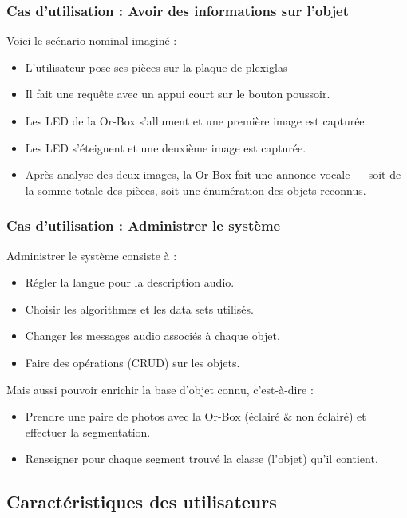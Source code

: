     \subsubsection{Cas d'utilisation : Avoir des informations sur l'objet}
        
Voici le scénario nominal imaginé :
\begin{itemize}
    \item L'utilisateur pose ses pièces sur la plaque de plexiglas
    \item Il fait une requête avec un appui court sur le bouton poussoir.
    \item Les LED de la Or-Box s'allument et une première image est capturée.
    \item Les LED s’éteignent et une deuxième image est capturée.
    \item Après analyse des deux images, la Or-Box fait une annonce vocale --- soit de la somme totale des pièces, soit une énumération des objets reconnus.
\end{itemize}
            
    \subsubsection{Cas d'utilisation : Administrer le système}

Administrer le système consiste à :
\begin{itemize}
    \item Régler la langue pour la description audio.
    \item Choisir les algorithmes et les data sets utilisés.
    \item Changer les messages audio associés à chaque objet.
    \item Faire des opérations (CRUD) sur les objets.
\end{itemize}

Mais aussi pouvoir enrichir la base d'objet connu, c'est-à-dire :
\begin{itemize}
    \item Prendre une paire de photos avec la Or-Box (éclairé \& non éclairé) et effectuer la segmentation.
    \item Renseigner pour chaque segment trouvé la classe (l'objet) qu'il contient.
\end{itemize}


	\subsection{Caractéristiques des utilisateurs}
	\label{sec:caracUser}

